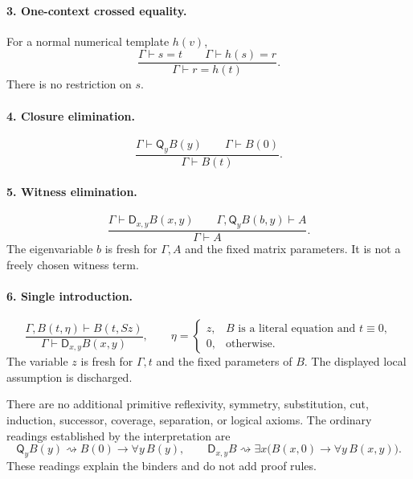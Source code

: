 \documentclass[11pt]{article}
\newcommand{\Q}{\mathsf Q}\newcommand{\D}{\mathsf D}
\begin{document}
\paragraph{3. One-context crossed equality.}
For a normal numerical template \(h(v)\),
\[
 \frac{\Gamma\vdash s=t\qquad\Gamma\vdash h(s)=r}
      {\Gamma\vdash r=h(t)}.
                                                        \tag{X}\label{eq:x}
\]
There is no restriction on \(s\).

\paragraph{4. Closure elimination.}
\[
 \frac{\Gamma\vdash\Q_y B(y)\qquad\Gamma\vdash B(0)}
      {\Gamma\vdash B(t)}.
                                                        \tag{QE}
\]
\paragraph{5. Witness elimination.}
\[
 \frac{\Gamma\vdash\D_{x,y}B(x,y)
       \qquad\Gamma,\Q_y B(b,y)\vdash A}
      {\Gamma\vdash A}.
                                                        \tag{DE}
\]
The eigenvariable \(b\) is fresh for \(\Gamma,A\) and the fixed matrix
parameters. It is not a freely chosen witness term.

\paragraph{6. Single introduction.}
\[
 \frac{\Gamma,B(t,\eta)\vdash B(t,Sz)}
      {\Gamma\vdash\D_{x,y}B(x,y)},\qquad
 \eta=\begin{cases}
 z,&B\text{ is a literal equation and }t\equiv0,\\
 0,&\text{otherwise}.
 \end{cases}                                            \tag{DI}\label{eq:di}
\]
The variable \(z\) is fresh for \(\Gamma,t\) and the fixed parameters
of \(B\). The displayed local assumption is discharged.

There are no additional primitive reflexivity, symmetry, substitution,
cut, induction, successor, coverage, separation, or logical axioms.
The ordinary readings established by the interpretation are
\[
 \Q_yB(y)\rightsquigarrow B(0)\to\forall y\,B(y),\qquad
 \D_{x,y}B\rightsquigarrow
    \exists x\bigl(B(x,0)\to\forall y\,B(x,y)\bigr).
                                                        \tag{Reading}
\]
These readings explain the binders and do not add proof rules.
\end{document}

